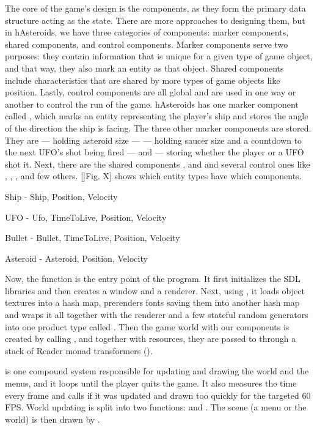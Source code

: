 \documentclass[
  digital, %
  table,   %
  twoside, %
  lof,     %
  lot,     %
]{fithesis3}
\begin{document}
The core of the game's design is the components,
as they form the primary data structure acting as the state.
There are more approaches to designing them, but in hAsteroids,
we have three categories of components: marker components,
shared components, and control components. Marker components serve two purposes:
they contain information that is unique for a given type of game object,
and that way, they also mark an entity as that object.
Shared components include characteristics that are shared by more types
of game objects like position. Lastly, control components are all global
and are used in one way or another to control the run of the game.
hAsteroids has one  marker component called ,
which marks an entity representing the player's ship and stores
the angle of the direction the ship is facing. The three other marker
components are  stored. They are  — holding
asteroid size —  — holding saucer size and a countdown
to the next UFO's shot being fired — and  — storing whether
the player or a UFO shot it. Next, there are the shared components
,  and 
and several  control ones like ,
, ,  and few others.
[]Fig. X] shows which entity types have which components.

Ship - Ship, Position, Velocity

UFO - Ufo, TimeToLive, Position, Velocity

Bullet - Bullet, TimeToLive, Position, Velocity

Asteroid - Asteroid, Position, Velocity

Now, the  function is the entry point of the program. It first initializes
the SDL libraries and then creates a window and a renderer. Next, using ,
it loads object textures into a hash map, prerenders fonts saving them into another
hash map and wraps it all together with the renderer and a few stateful random generators
into one product type called . Then the game world with our
components is created by calling , and together with resources,
they are passed to  through a stack
of Reader monad transformers ().

 is one compound system responsible for updating and drawing
the world and the menus, and it loops until the player quits the game.
It also measures the time every frame and calls  if it was
updated and drawn too quickly for the targeted 60 FPS. World updating is split
into two functions:  and .
The scene (a menu or the world) is then drawn by .
\end{document}
